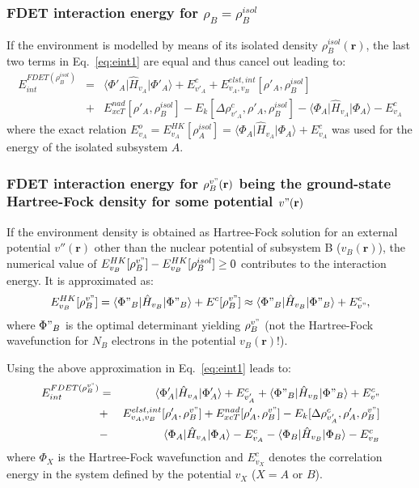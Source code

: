 \documentclass[amsmath,amssymb,preprint,aip,jcp]{revtex4-1}
\newcommand{\nr}[1]{\color{red}#1\color{black}}
\begin{document}
\subsubsection{FDET interaction energy for $\rho_B=\rho_B^{isol}$}
\nr{If the environment is modelled by means of its isolated density $\rho_B^{isol}(\mathbf{r})$}, the last two terms in Eq.~\ref{eq:eint1} are equal \nr{and thus cancel out } leading to:
\begin{eqnarray}
E_{int}^{FDET(\rho_B^{isol})}&=&
\langle\Phi'_{A}\vert \hat{H}_{v_A}\vert \Phi'_{A}\rangle + E^{c}_{v'_A}
+ E^{elst,int}_{v_A,v_B}[\rho'_A,\rho_B^{isol}]  \label{eq:eint2}\\
&+& {E}_{xcT}^{nad}[\rho'_A,\rho_B^{isol}]     - E_k[\Delta \rho^{c}_{v'_A}, \rho'_A, \rho_B^{isol}]  - 
\langle\Phi_{A}\vert \hat{H}_{v_A}\vert \Phi_{A}\rangle - E^{c}_{v_A}
\nonumber
\end{eqnarray}
where the exact relation $E_{v_A}^o=E_{v_A}^{HK}[\rho_A^{isol}]=\langle\Phi_{A}\vert \hat{H}_{v_A}\vert \Phi_{A}\rangle + E^{c}_{v_A}$ was used for the energy of the isolated subsystem $A$.

\subsubsection{FDET interaction energy for  $\rho_B^{v"}(\mathbf{r})$ being the ground-state Hartree-Fock density for some 
 potential $v"(\mathbf{r})$} 
\nr{If the environment density is obtained as Hartree-Fock solution for an external potential $v''(\mathbf{r})$ other than the nuclear potential of subsystem B ($v_B(\mathbf{r})$)}, the numerical value of 
${E}^{HK}_{v_B}[\rho_B^{v"}]-{E}^{HK}_{v_B}[\rho_B^{isol}]\ge 0$ contributes to the interaction energy. 
It \nr{is } approximated as:
\begin{eqnarray}
{E}^{HK}_{v_B}[\rho_B^{v"}]=\langle\Phi"_{B}\vert \hat{H}_{v_B}\vert \Phi"_{B}\rangle+E^{c}[\rho_B^{v"}] \approx \langle\Phi"_{B}\vert \hat{H}_{v_B}\vert \Phi"_{B}\rangle+E^{c}_{v"},   \label{eq:evb} 
\end{eqnarray}
where $\Phi"_{B}$ is the optimal determinant yielding $\rho_B^{v"}$ (not the Hartree-Fock wavefunction for $N_B$ electrons in the potential ${v_B}(\mathbf{r})$!).

Using the above approximation in Eq.~\ref{eq:eint1} leads to:
 \begin{eqnarray}
E_{int}^{FDET(\rho_B^{v"})} 
&=&  \langle\Phi'_{A}\vert \hat{H}_{v_A}\vert \Phi'_{A}\rangle + E^{c}_{v'_A} + \langle\Phi"_{B}\vert \hat{H}_{v_B}\vert \Phi"_{B}\rangle  + E^{c}_{v"} \label{eq:eint3}\\ \nonumber
&+& E^{elst,int}_{v_A,v_B}[\rho'_A,\rho_B^{v"}] + {E}_{xcT}^{nad}[\rho'_A,\rho_B^{v"}]-     E_k[\Delta \rho^{c}_{v'_A}, \rho'_A, \rho_B^{v"}]  \nonumber\\
&-& 
\langle\Phi_{A}\vert \hat{H}_{v_A}\vert \Phi_{A}\rangle - E^{c}_{v_A}
- \langle\Phi_{B}\vert \hat{H}_{v_B}\vert \Phi_{B}\rangle - E^{c}_{v_B}\nonumber
\end{eqnarray}
where $\Phi_{X}$ is the Hartree-Fock wavefunction and  $E^{c}_{v_X}$ denotes the correlation energy in the system defined by the potential $v_X$ ($X=A$ or $B$).
\end{document}
